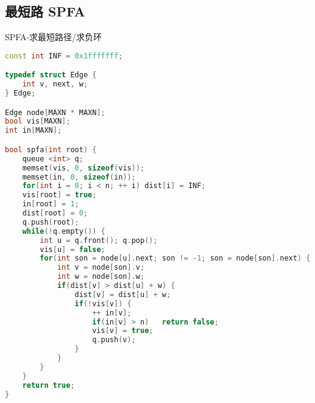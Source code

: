 \subsection{最短路 SPFA}
SPFA-求最短路径/求负环
    \begin{lstlisting}[language=c++]
const int INF = 0x1fffffff;

typedef struct Edge {
    int v, next, w;
} Edge;

Edge node[MAXN * MAXN];
bool vis[MAXN];
int in[MAXN];

bool spfa(int root) {
    queue <int> q;
    memset(vis, 0, sizeof(vis));
    memset(in, 0, sizeof(in));
    for(int i = 0; i < n; ++ i) dist[i] = INF;
    vis[root] = true;
    in[root] = 1;
    dist[root] = 0;
    q.push(root);
    while(!q.empty()) {
        int u = q.front(); q.pop();
        vis[u] = false;
        for(int son = node[u].next; son != -1; son = node[son].next) {
            int v = node[son].v;
            int w = node[son].w;
            if(dist[v] > dist[u] + w) {
                dist[v] = dist[u] + w;
                if(!vis[v]) {
                    ++ in[v];
                    if(in[v] > n)   return false;
                    vis[v] = true;
                    q.push(v);
                }
            }
        }
    }
    return true;
}
    \end{lstlisting}
